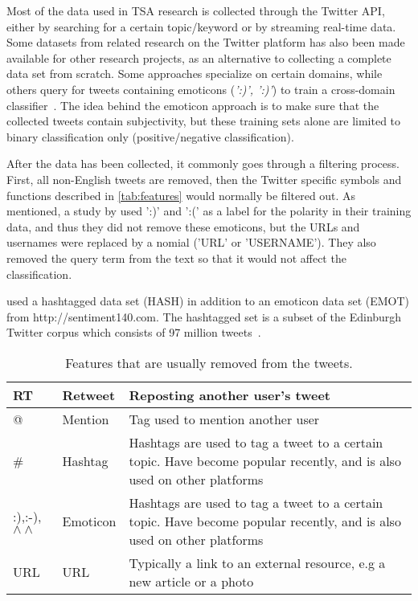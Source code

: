 Most of the data used in TSA research is collected through the Twitter API, either by searching for a certain topic/keyword or by streaming real-time data. Some datasets from related research on the Twitter platform has also been made available for other research projects, as an alternative to collecting a complete data set from scratch. Some approaches specialize on certain domains, while others query for tweets containing emoticons (\emph{':)', ':)'}) to train a cross-domain classifier~\citep{article:go}. The idea behind the emoticon approach is to make sure that the collected tweets contain subjectivity, but these training sets alone are limited to binary classification only (positive/negative classification).

After the data has been collected, it commonly goes through a filtering process. First, all non-English tweets are removed, then the Twitter specific symbols and functions described in \autoref{tab:features} would normally be filtered out. As mentioned, a study by \cite{article:go} used ':)' and ':(' as a label for the polarity in their training data, and thus they did not remove these emoticons, but the URLs and usernames were replaced by a nomial ('URL' or 'USERNAME'). They also removed the query term from the text so that it would not affect the classification.

\cite{article:omg} used a hashtagged data set (HASH) in addition to an emoticon data set (EMOT) from http://sentiment140.com. The hashtagged set is a subset of the Edinburgh Twitter corpus which consists of 97 million tweets~\citep{article:edinburgh}.

\begin{table}[]
\centering
\begin{tabular}{|l|l|p{8cm}|}
\hline
RT & Retweet & Reposting another user's tweet \\ \hline
@ & Mention & Tag used to mention another user \\ \hline
\# & Hashtag & Hashtags are used to tag a tweet to a certain topic. Have become popular recently, and is also used on other platforms \\ \hline
:),:-),$\wedge\wedge$ & Emoticon & Hashtags are used to tag a tweet to a certain topic. Have become popular recently, and is also used on other platforms \\ \hline
URL & URL & Typically a link to an external resource, e.g a new article or a photo \\ \hline
\end{tabular}
\caption{Features that are usually removed from the tweets.}
\label{tab:features}
\end{table}

